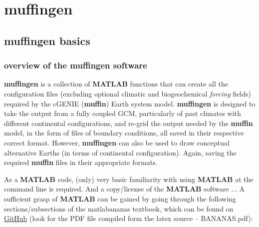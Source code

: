 \documentclass[11pt,fleqn]{book} %
\begin{document}

\cleardoublepage


\chapter{muffingen}\label{ch:muffingen}

\hfill \break
\vspace{24mm}


\newpage

\section{muffingen basics}


\subsection{overview of the muffingen software}

\textbf{muffingen} is a collection of \textbf{MATLAB} functions that can create all the configuration files (excluding optional climatic and biogeochemical \textit{forcing} fields) required by the cGENIE (\textbf{muffin}) Earth system model. \textbf{muffingen} is designed to take the output from a fully coupled GCM, particularly of past climates with different continental configurations, and re-grid the output needed by the \textbf{muffin} model, in the form of files of boundary conditions, all  saved  in their respective correct format. However, \textbf{muffingen} can also be used to draw conceptual alternative Earths (in terms of continental configuration). Again, saving the required \textbf{muffin} files in their appropriate formats.

As a \textbf{MATLAB} code, (only) very basic familiarity with using \textbf{MATLAB} at the command line is required. And a copy/license of the \textbf{MATLAB} software ... A sufficient grasp of \textbf{MATLAB} can be gained by going through the following sections/subsections of the \textsf{matlabananas} textbook, which can be found on \href{https://github.com/derpycode/matlabananas}{GitHub} (look for the PDF file compiled form the latex source -- \textsf{BANANAS.pdf}):
\end{document}
